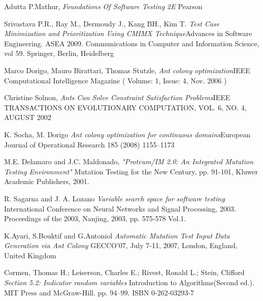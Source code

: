 \documentclass[journal]{IEEEtran}
\begin{document}
\begin{thebibliography}{1}
Adutta P.Mathur,
\textit{Foundations Of Software Testing 2E}
Pearson

Srivastava P.R., Ray M., Dermoudy J., Kang BH., Kim T.
\textit{Test Case Minimization and Prioritization Using CMIMX Technique}Advances in Software Engineering. ASEA 2009. Communications in Computer and Information Science, vol 59. Springer, Berlin, Heidelberg

Marco Dorigo, Mauro Birattari, Thomas Stutzle,
\textit{Ant colony optimization}IEEE Computational Intelligence Magazine ( Volume: 1, Issue: 4, Nov. 2006 )

Christine Solnon,
\textit{Ants Can Solve Constraint Satisfaction Problems}IEEE TRANSACTIONS ON EVOLUTIONARY COMPUTATION, VOL. 6, NO. 4, AUGUST 2002

K. Socha, M. Dorigo
\textit{Ant colony optimization for continuous domains}European Journal of Operational Research 185 (2008) 1155–1173

M.E. Delamaro and J.C. Maldonado, 
\textit{"Proteum/IM 2.0: An Integrated Mutation Testing Environment"} 
Mutation Testing for the New Century, pp. 91-101, Kluwer Academic Publishers, 2001.


R. Sagarna and J. A. Lozano
\textit{Variable search space for software testing}
International Conference on Neural Networks and Signal Processing, 2003. Proceedings of the 2003, Nanjing, 2003, pp. 575-578 Vol.1.

K.Ayari, S.Bouktif and G.Antoniol
\textit{Automatic Mutation Test Input Data Generation via Ant Colony}
GECCO'07, July 7-11, 2007, London, England, United Kingdom

Cormen, Thomas H.; Leiserson, Charles E.; Rivest, Ronald L.; Stein, Clifford
\textit{Section 5.2: Indicator random variables}
Introduction to Algorithms(Second ed.). MIT Press and McGraw-Hill. pp. 94–99. ISBN 0-262-03293-7
\end{thebibliography}
\end{document}
